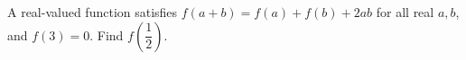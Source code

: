 A real-valued function satisfies $ f(a+b)=f(a)+f(b)+2ab $ for all real $ a,b $, and $ f(3)=0 $. Find $ f(\dfrac{1}{2})$.
